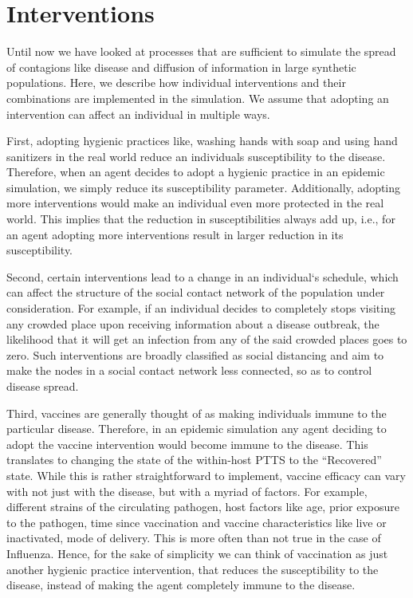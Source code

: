 \documentclass[doublespace,draft]{VTthesis}
\begin{document}
    \section{Interventions}
    
    Until now we have looked at processes that are sufficient to simulate the spread of contagions like disease and diffusion of information in large synthetic populations. Here, we describe how individual interventions and their combinations are implemented in the simulation. We assume that adopting an intervention can affect an individual in multiple ways. 
    
    First, adopting hygienic practices like, washing hands with soap and using hand sanitizers in the real world reduce an individuals susceptibility to the disease. Therefore, when an agent decides to adopt a hygienic practice in an epidemic simulation, we simply reduce its susceptibility parameter. Additionally, adopting more interventions would make an individual even more protected in the real world. This implies that the reduction in susceptibilities always add up, i.e., for an agent adopting more interventions result in larger reduction in its susceptibility. 
    
    Second, certain interventions lead to a change in an individual`s schedule, which can affect the structure of the social contact network of the population under consideration. For example, if an individual decides to completely stops visiting any crowded place upon receiving information about a disease outbreak, the likelihood that it will get an infection from any of the said crowded places goes to zero. Such interventions are broadly classified as social distancing and aim to make the nodes in a social contact network less connected, so as to control disease spread. 
    
    Third, vaccines are generally thought of as making individuals immune to the particular disease. Therefore, in an epidemic simulation any agent deciding to adopt the vaccine intervention would become immune to the disease. This translates to changing the state of the within-host PTTS to the ``Recovered'' state. While this is rather straightforward to implement, vaccine efficacy can vary with not just with the disease, but with a myriad of factors. For example, different strains of the circulating pathogen, host factors like age, prior exposure to the pathogen, time since vaccination and vaccine characteristics like live or inactivated, mode of delivery. This is more often than not true in the case of Influenza. Hence, for the sake of simplicity we can think of vaccination as just another hygienic practice intervention, that reduces the susceptibility to the disease, instead of making the agent completely immune to the disease.
    
\end{document}
